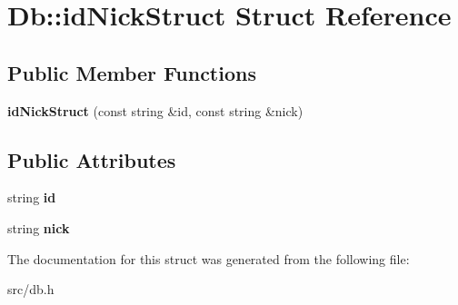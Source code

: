 \hypertarget{struct_db_1_1id_nick_struct}{
\section{Db::idNickStruct Struct Reference}
\label{struct_db_1_1id_nick_struct}
}
\subsection*{Public Member Functions}
\begin{DoxyCompactItemize}
\item 
\hypertarget{struct_db_1_1id_nick_struct_a28c55b92db6b17184e38654a8c27a7ff}{
{\bfseries idNickStruct} (const string \&id, const string \&nick)}
\label{struct_db_1_1id_nick_struct_a28c55b92db6b17184e38654a8c27a7ff}

\end{DoxyCompactItemize}
\subsection*{Public Attributes}
\begin{DoxyCompactItemize}
\item 
\hypertarget{struct_db_1_1id_nick_struct_ab92c2067fd6e8d59673d48f98e4c3e2a}{
string {\bfseries id}}
\label{struct_db_1_1id_nick_struct_ab92c2067fd6e8d59673d48f98e4c3e2a}

\item 
\hypertarget{struct_db_1_1id_nick_struct_a4e3f1e6c3dbdaebd1795a77f5d5cd296}{
string {\bfseries nick}}
\label{struct_db_1_1id_nick_struct_a4e3f1e6c3dbdaebd1795a77f5d5cd296}

\end{DoxyCompactItemize}


The documentation for this struct was generated from the following file:\begin{DoxyCompactItemize}
\item 
src/db.h\end{DoxyCompactItemize}
